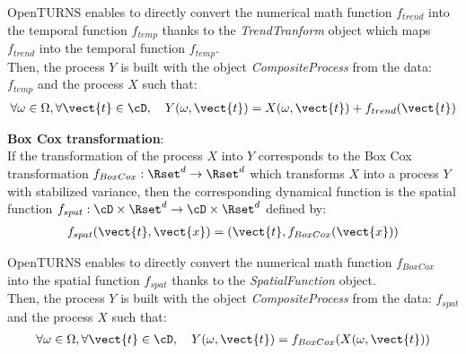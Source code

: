 OpenTURNS enables to directly convert the numerical math function $f_{trend}$ into the temporal function $f_{temp}$ thanks to  the \emph{TrendTranform} object which maps $f_{trend}$ into  the temporal function $f_{temp}$.\\

Then, the process $Y$ is built with the object \emph{CompositeProcess} from the data: $f_{temp}$ and the process $X$ such that:
\begin{align*}
  \forall \omega \in \Omega, \forall \vect{t} \in \cD, \quad Y(\omega, \vect{t}) = X(\omega, \vect{t}) + f_{trend}(\vect{t})
\end{align*}
\vspace*{0.1cm}

{\bf Box Cox transformation}: \\
If the transformation of the process $X$ into $Y$ corresponds to the Box Cox transformation  $f_{BoxCox}: \Rset^d \rightarrow \Rset^d$  which transforms $X$ into a process $Y$ with stabilized variance, then the corresponding dynamical function is the spatial function $f_{spat}: \cD \times \Rset^d \rightarrow \cD \times \Rset^d$ defined by:
\begin{align}\label{spatFuncBC}
  f_{spat}(\vect{t}, \vect{x})=(\vect{t},f_{BoxCox}(\vect{x}))
\end{align}

OpenTURNS enables to directly convert the numerical math function $f_{BoxCox}$ into the spatial function $f_{spat}$ thanks to the  \emph{SpatialFunction} object. \\

Then, the process $Y$ is built with the object \emph{CompositeProcess} from the data: $f_{spat}$ and the process $X$ such that:
\begin{align*}
  \forall \omega \in \Omega, \forall \vect{t} \in \cD, \quad Y(\omega, \vect{t}) = f_{BoxCox}(X(\omega, \vect{t}))
\end{align*}
\vspace*{0.1cm}


